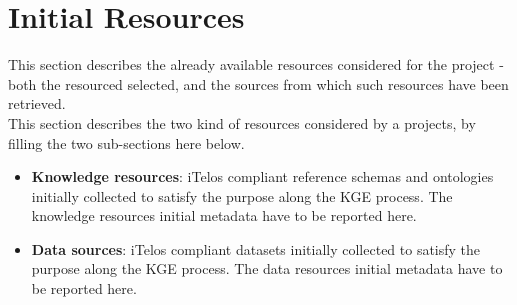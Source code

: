 \section{Initial Resources}

This section describes the already available resources considered for the project - both the resourced selected, and the sources from which such resources have been retrieved.\\

This section describes the two kind of resources considered by a projects, by filling the two sub-sections here below.
\begin{itemize}  
    \item \textbf{Knowledge resources}: iTelos compliant reference schemas and ontologies initially collected to satisfy the purpose along the KGE process. The knowledge resources initial metadata have to be reported here.
    
    \item \textbf{Data sources}: iTelos compliant datasets initially collected to satisfy the purpose along the KGE process. The data resources initial metadata have to be reported here.
\end{itemize}
